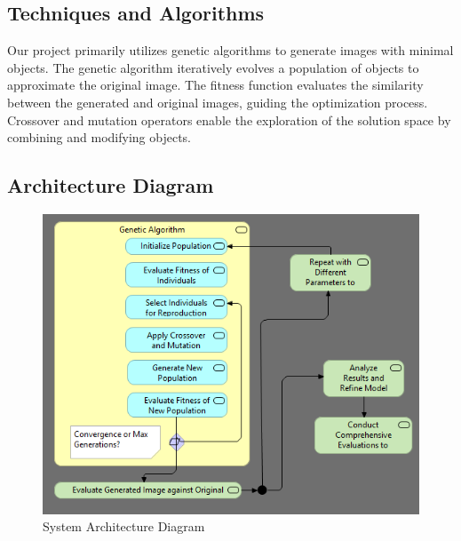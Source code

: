 \documentclass[10pt, conference]{IEEEtran}
\begin{document}
\subsection{Techniques and Algorithms}
Our project primarily utilizes genetic algorithms to generate images with minimal objects. The genetic algorithm iteratively evolves a population of objects to approximate the original image. The fitness function evaluates the similarity between the generated and original images, guiding the optimization process. Crossover and mutation operators enable the exploration of the solution space by combining and modifying objects.

\subsection{Architecture Diagram}
\begin{figure}[h!]
	\centering
	\includegraphics[width=0.8\linewidth]{architecture_diagram.png}
	\caption{System Architecture Diagram}
\end{figure}
\end{document}
